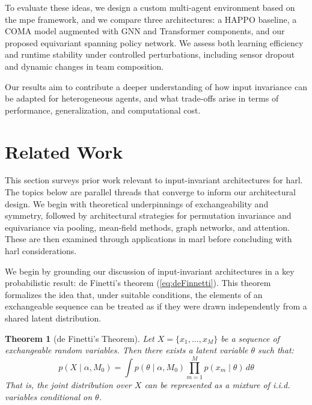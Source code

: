 \documentclass{article}
\newtheorem{theorem}{Theorem}
\begin{document}
To evaluate these ideas, we design a custom multi-agent 
environment based on the \gls{mpe} framework, and we compare three architectures: 
a HAPPO baseline, a COMA model augmented with GNN and Transformer components, 
and our proposed equivariant spanning policy network. 
We assess both learning efficiency and runtime stability 
under controlled perturbations, including sensor dropout 
and dynamic changes in team composition.

Our results aim to contribute a deeper understanding of how 
input invariance can be adapted for heterogeneous agents, 
and what trade-offs arise in terms of performance, 
generalization, and computational cost.


\section{Related Work}

This section surveys prior work relevant to input-invariant architectures for \gls{harl}. 
The topics below are parallel threads that converge to inform our architectural design.
We begin with theoretical underpinnings of exchangeability and symmetry, 
followed by architectural strategies for permutation invariance and equivariance
via pooling, mean-field methods, graph networks, and attention. 
These are then examined through applications in \gls{marl} 
before concluding with \gls{harl} considerations.

We begin by grounding our discussion of input-invariant architectures 
in a key probabilistic result: de Finetti's theorem (\cref{eq:deFinnetti}). 
This theorem formalizes the idea that, under suitable conditions, 
the elements of an exchangeable sequence can be treated as if 
they were drawn independently from a shared latent distribution.

\begin{theorem}[de Finetti's Theorem]
    Let \(X = \{x_1, \ldots, x_M\}\) be a sequence of exchangeable random variables.
    Then there exists a latent variable \(\theta\) such that:
    \begin{equation}
        p(X \mid \alpha, M_0) = \int p(\theta \mid \alpha, M_0) 
        \prod_{m=1}^{M} p(x_m \mid \theta)\, d\theta
        \label{eq:deFinnetti}
    \end{equation}
    That is, the joint distribution over \(X\) can be represented as a mixture of 
    i.i.d. variables conditional on \(\theta\).
\end{theorem}
\end{document}
